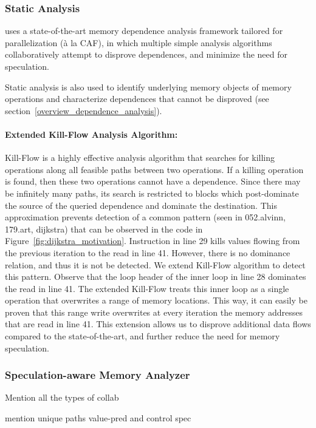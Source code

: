 
\subsubsection{Static Analysis}

\name uses a state-of-the-art memory dependence analysis framework
tailored for parallelization (\`{a} la CAF\cite{johnson:cgo:17}), in
which multiple simple analysis algorithms collaboratively attempt to
disprove dependences, and minimize the need for speculation.

Static analysis is also used to identify underlying memory objects of
memory operations and characterize dependences that cannot
be disproved (see section~\ref{overview_dependence_analysis}).

\paragraph{Extended Kill-Flow Analysis Algorithm:}
Kill-Flow is a highly effective analysis algorithm that searches for
killing operations along all feasible paths between two operations. If
a killing operation is found, then these two operations cannot have a
dependence.  Since  there  may  be  infinitely  many  paths,  its
search is restricted to blocks which post-dominate the source of the
queried dependence and dominate the destination.
%
This approximation prevents detection of a common pattern (seen in
052.alvinn, 179.art, dijkstra) that can be observed in the code in
Figure~\ref{fig:dijkstra_motivation}.
%
Instruction in line 29 kills values flowing from the previous
iteration to the read in line 41.  However, there is no dominance
relation, and thus it is not be detected.
%
We extend Kill-Flow algorithm to detect this pattern.  Observe that
the loop header of the inner loop in line 28 dominates the read in
line 41.  The extended Kill-Flow treats this inner loop as a single
operation that overwrites a range of memory locations. This way, it
can easily be proven that this range write overwrites at every
iteration the memory addresses that are read in line 41.
%
%
This extension allows us to disprove additional data flows compared to
the state-of-the-art, and further reduce the need for memory
speculation.

\subsubsection{Speculation-aware Memory Analyzer}

Mention all the types of collab

mention unique paths
value-pred and
control spec


